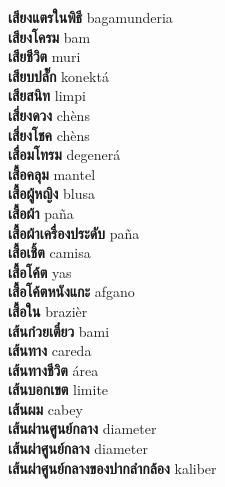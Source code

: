 \textbf{ เสียงแตรในพิธี  } bagamunderia \\
\textbf{ เสียงโครม  } bam \\
\textbf{ เสียชีวิต  } muri \\
\textbf{ เสียบปลั๊ก  } konektá \\
\textbf{ เสียสนิท  } limpi \\
\textbf{ เสี่ยงดวง  } chèns \\
\textbf{ เสี่ยงโชค  } chèns \\
\textbf{ เสื่อมโทรม  } degenerá \\
\textbf{ เสื้อคลุม  } mantel \\
\textbf{ เสื้อผู้หญิง  } blusa \\
\textbf{ เสื้อผ้า  } paña \\
\textbf{ เสื้อผ้าเครื่องประดับ  } paña \\
\textbf{ เสื้อเชิ้ต  } camisa \\
\textbf{ เสื้อโค้ต  } yas \\
\textbf{ เสื้อโค้ตหนังแกะ  } afgano \\
\textbf{ เสื้อใน  } brazièr \\
\textbf{ เส้นก๋วยเตี๋ยว  } bami \\
\textbf{ เส้นทาง  } careda \\
\textbf{ เส้นทางชีวิต  } área \\
\textbf{ เส้นบอกเขต  } limite \\
\textbf{ เส้นผม  } cabey \\
\textbf{ เส้นผ่านศูนย์กลาง  } diameter \\
\textbf{ เส้นผ่าศูนย์กลาง  } diameter \\
\textbf{ เส้นผ่าศูนย์กลางของปากลำกล้อง  } kaliber \\
